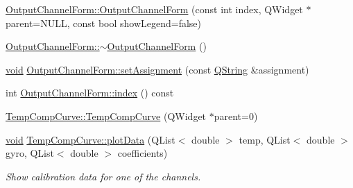 \begin{DoxyCompactItemize}
\item 
\hyperlink{group___config_plugin_ga5b19b5a7b71ecffbf0b3f5ac2cbae18d}{\-Output\-Channel\-Form\-::\-Output\-Channel\-Form} (const int index, \-Q\-Widget $\ast$parent=\-N\-U\-L\-L, const bool show\-Legend=false)
\item 
\hyperlink{group___config_plugin_ga6b25b9aa17895f0d557626e4dea077dd}{\-Output\-Channel\-Form\-::$\sim$\-Output\-Channel\-Form} ()
\item 
\hyperlink{group___u_a_v_objects_plugin_ga444cf2ff3f0ecbe028adce838d373f5c}{void} \hyperlink{group___config_plugin_gacdf981958669fa47fe697e39fa529a16}{\-Output\-Channel\-Form\-::set\-Assignment} (const \hyperlink{group___u_a_v_objects_plugin_gab9d252f49c333c94a72f97ce3105a32d}{\-Q\-String} \&assignment)
\item 
int \hyperlink{group___config_plugin_ga04c058165995634381c105cad76f4209}{\-Output\-Channel\-Form\-::index} () const 
\item 
\hyperlink{group___config_plugin_gadde0ad4527ea2096cecb195d2a635014}{\-Temp\-Comp\-Curve\-::\-Temp\-Comp\-Curve} (\-Q\-Widget $\ast$parent=0)
\item 
\hyperlink{group___u_a_v_objects_plugin_ga444cf2ff3f0ecbe028adce838d373f5c}{void} \hyperlink{group___config_plugin_ga19bcca9caf37d6e7360270c37542d1b5}{\-Temp\-Comp\-Curve\-::plot\-Data} (\-Q\-List$<$ double $>$ temp, \-Q\-List$<$ double $>$ gyro, \-Q\-List$<$ double $>$ coefficients)
\begin{DoxyCompactList}\small\item\em \-Show calibration data for one of the channels. \end{DoxyCompactList}\end{DoxyCompactItemize}
